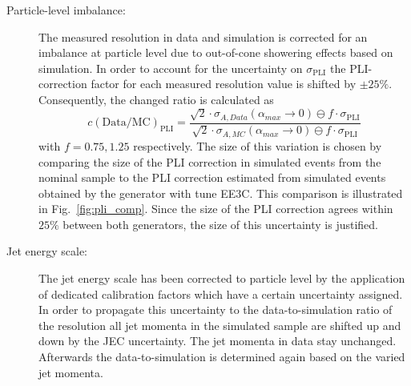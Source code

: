 \begin{description}
 \item[Particle-level imbalance:] 
The measured resolution in data and simulation is corrected for an imbalance at particle level due to out-of-cone showering effects based on simulation. In order to account for the uncertainty on $\sigma_\mathrm{PLI}$ the PLI-correction factor for each measured resolution value is shifted by $\pm 25\%$. Consequently, the changed ratio is calculated as
 \begin{equation}
  c\mathrm{(Data/MC)_{PLI}} = \frac{\sqrt{2} \cdot \sigma_{A, Data}(\alpha_{max} \rightarrow 0) \ominus f \cdot \sigma_\mathrm{PLI}}{\sqrt{2} \cdot \sigma_{A, MC}(\alpha_{max} \rightarrow 0) \ominus f \cdot \sigma_\mathrm{PLI}}  
 \end{equation}
with $f=0.75, 1.25$ respectively. The size of this variation is chosen by comparing the size of the PLI correction in simulated events from the nominal \pythia sample to the PLI correction estimated from simulated events obtained by the \herwig generator with tune EE3C. This comparison is illustrated in Fig.~\ref{fig:pli_comp}. Since the size of the PLI correction agrees within $25\%$ between both generators, the size of this uncertainty is justified.
 
 \item[Jet energy scale:] The jet energy scale has been corrected to particle level by the application of dedicated calibration factors which have a certain uncertainty assigned. In order to propagate this uncertainty to the data-to-simulation ratio of the resolution all jet momenta in the simulated sample are shifted up and down by the JEC uncertainty. The jet momenta in data stay unchanged. Afterwards the data-to-simulation is determined again based on the varied jet momenta.


\end{description}
